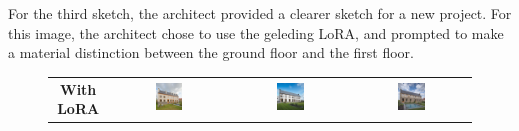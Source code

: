 For the third sketch, the architect provided a clearer sketch for a new project. For this image, the architect chose to use the geleding LoRA, and prompted to make a material distinction between the ground floor and the first floor.
\begin{figure}[H]
  \centering
  {\footnotesize
  \renewcommand{\arraystretch}{1.1}
  \setlength{\tabcolsep}{4pt}
  \begin{tabular}{c c c c}
    \textbf{With LoRA} & \includegraphics[width=0.25\textwidth]{Images/Results/Architect-A_unstructured-phase/generated_images/3/Met_lora_00019_.png} & \includegraphics[width=0.25\textwidth]{Images/Results/Architect-A_unstructured-phase/generated_images/3/Met_lora_00023_.png} & \includegraphics[width=0.25\textwidth]{Images/Results/Architect-A_unstructured-phase/generated_images/3/Met_lora_00026_.png} \\

\end{tabular}}
\end{figure}

